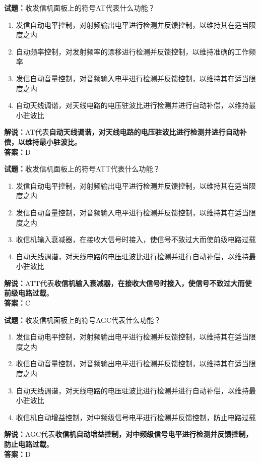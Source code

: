 \documentclass{ctexbook}
\begin{document}
\bigskip


\noindent\textbf{试题：}收发信机面板上的符号AT代表什么功能？
\begin{enumerate}[leftmargin=3em]
\item 发信自动电平控制，对射频输出电平进行检测并反馈控制，以维持其在适当限度之内
\item 自动频率控制，对发射频率的漂移进行检测并反馈控制，以维持准确的工作频率
\item 发信自动音量控制，对音频输入电平进行检测并反馈控制，以维持其在适当限度之内
\item 自动天线调谐，对天线电路的电压驻波比进行检测并进行自动补偿，以维持最小驻波比
\end{enumerate}
\noindent\textbf{解说：}AT代表\textbf{自动天线调谐，对天线电路的电压驻波比进行检测并进行自动补偿，以维持最小驻波比}。\\\noindent\textbf{答案：}D




\bigskip


\noindent\textbf{试题：}收发信机面板上的符号ATT代表什么功能？
\begin{enumerate}[leftmargin=3em]
\item 发信自动电平控制，对射频输出电平进行检测并反馈控制，以维持其在适当限度之内
\item 发信自动音量控制，对音频输入电平进行检测并反馈控制，以维持其在适当限度之内
\item 收信机输入衰减器，在接收大信号时接入，使信号不致过大而使前级电路过载
\item 自动天线调谐，对天线电路的电压驻波比进行检测并进行自动补偿，以维持最小驻波比
\end{enumerate}
\noindent\textbf{解说：}ATT代表\textbf{收信机输入衰减器，在接收大信号时接入，使信号不致过大而使前级电路过载}。\\\noindent\textbf{答案：}C




\bigskip


\noindent\textbf{试题：}收发信机面板上的符号AGC代表什么功能？
\begin{enumerate}[leftmargin=3em]
\item 发信自动电平控制，对射频输出电平进行检测并反馈控制，以维持其在适当限度之内
\item 收信自动音量控制，对音频输出电平进行检测并反馈控制，以维持其在适当限度之内
\item 自动天线调谐，对天线电路的电压驻波比进行检测并进行自动补偿，以维持最小驻波比
\item 收信机自动增益控制，对中频级信号电平进行检测并反馈控制，防止电路过载
\end{enumerate}
\noindent\textbf{解说：}AGC代表\textbf{收信机自动增益控制，对中频级信号电平进行检测并反馈控制，防止电路过载}。\\\noindent\textbf{答案：}D
\end{document}
